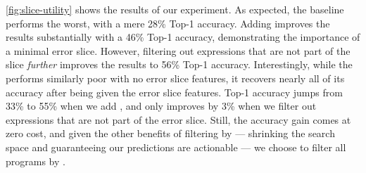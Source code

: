 \autoref{fig:slice-utility} shows the results of our experiment.
%
As expected, the baseline performs the worst, with a mere 28\% \linear
Top-1 accuracy.
%
Adding \InSlice improves the results substantially with a 46\% \linear Top-1
accuracy, demonstrating the importance of a minimal error slice.
%
However, filtering out expressions that are not part of the slice
\emph{further} improves the results to 56\% \linear Top-1 accuracy.
%
Interestingly, while the \hiddenFH performs similarly poor with no error
slice features, it recovers nearly all of its accuracy after being given
the error slice features.
%
Top-1 accuracy jumps from 33\% to 55\% when we add \InSlice, and only
improves by 3\% when we filter out expressions that are not part of the
error slice.
%
Still, the accuracy gain comes at zero cost, and given the other benefits
of filtering by \InSlice %
--- shrinking the search space and guaranteeing our predictions are actionable ---
we choose to filter all programs by \InSlice.

\label{sec:contextual-features}

